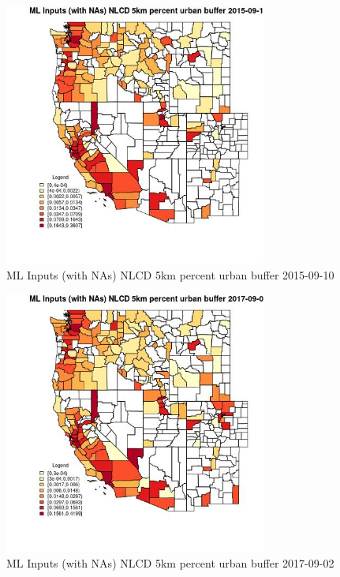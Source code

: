 \begin{figure} 
\centering  
\includegraphics[width=0.77\textwidth]{Code_Outputs/Report_ML_input_PM25_Step4_part_e_de_duplicated_aves_compiled_2019-05-20wNAs_CountyNLCD_5km_percent_urban_bufferMean2015-09-10.jpg} 
\caption{\label{fig:Report_ML_input_PM25_Step4_part_e_de_duplicated_aves_compiled_2019-05-20wNAsCountyNLCD_5km_percent_urban_bufferMean2015-09-10}ML Inputs (with NAs) NLCD 5km percent urban buffer 2015-09-10} 
\end{figure} 
 

\begin{figure} 
\centering  
\includegraphics[width=0.77\textwidth]{Code_Outputs/Report_ML_input_PM25_Step4_part_e_de_duplicated_aves_compiled_2019-05-20wNAs_CountyNLCD_5km_percent_urban_bufferMean2017-09-02.jpg} 
\caption{\label{fig:Report_ML_input_PM25_Step4_part_e_de_duplicated_aves_compiled_2019-05-20wNAsCountyNLCD_5km_percent_urban_bufferMean2017-09-02}ML Inputs (with NAs) NLCD 5km percent urban buffer 2017-09-02} 
\end{figure} 
 

